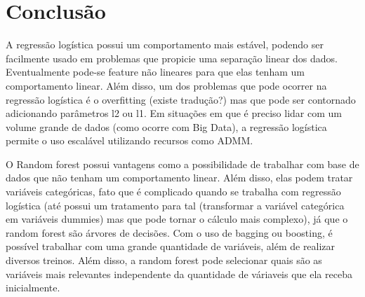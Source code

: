 \chapter{Conclusão}
A regressão logística possui um comportamento mais estável, podendo ser facilmente usado em problemas que propicie uma separação linear dos dados. Eventualmente pode-se feature não lineares para que elas tenham um comportamento linear. Além disso, um dos problemas que pode ocorrer na regressão logística é o overfitting (existe tradução?) mas que pode ser contornado adicionando parâmetros l2 ou l1. Em situações em que é preciso lidar com um volume grande de dados (como ocorre com Big Data), a regressão logística permite o uso escalável utilizando recursos como ADMM. 

O Random forest possui vantagens como a possibilidade de trabalhar com base de dados que não tenham um comportamento linear. Além disso, elas podem tratar variáveis categóricas, fato que é complicado quando se trabalha com regressão logística (até possui um tratamento para tal (transformar a variável categórica em variáveis dummies) mas que pode tornar o cálculo mais complexo), já que o random forest são árvores de decisões. Com o uso de bagging ou boosting, é possível trabalhar com uma grande quantidade de variáveis, além de realizar diversos treinos. Além disso, a random forest pode selecionar quais são as variáveis mais relevantes independente da quantidade de váriaveis que ela receba inicialmente.




